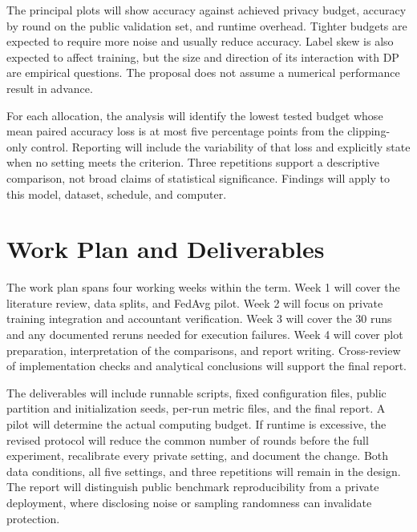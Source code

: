 \documentclass[nolineno]{ieeeaccess}
\begin{document}
The principal plots will show accuracy against achieved privacy budget, accuracy by round on the public validation set, and runtime overhead. Tighter budgets are expected to require more noise and usually reduce accuracy. Label skew is also expected to affect training, but the size and direction of its interaction with DP are empirical questions. The proposal does not assume a numerical performance result in advance.

For each allocation, the analysis will identify the lowest tested budget whose mean paired accuracy loss is at most five percentage points from the clipping-only control. Reporting will include the variability of that loss and explicitly state when no setting meets the criterion. Three repetitions support a descriptive comparison, not broad claims of statistical significance. Findings will apply to this model, dataset, schedule, and computer.

\section{Work Plan and Deliverables}
The work plan spans four working weeks within the term. Week 1 will cover the literature review, data splits, and FedAvg pilot. Week 2 will focus on private training integration and accountant verification. Week 3 will cover the 30 runs and any documented reruns needed for execution failures. Week 4 will cover plot preparation, interpretation of the comparisons, and report writing. Cross-review of implementation checks and analytical conclusions will support the final report.

The deliverables will include runnable scripts, fixed configuration files, public partition and initialization seeds, per-run metric files, and the final report. A pilot will determine the actual computing budget. If runtime is excessive, the revised protocol will reduce the common number of rounds before the full experiment, recalibrate every private setting, and document the change. Both data conditions, all five settings, and three repetitions will remain in the design. The report will distinguish public benchmark reproducibility from a private deployment, where disclosing noise or sampling randomness can invalidate protection.
\end{document}
